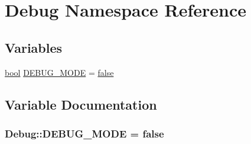 \hypertarget{namespace_debug}{\section{Debug Namespace Reference}
\label{namespace_debug}
}
\subsection*{Variables}
\begin{DoxyCompactItemize}
\item 
\hyperlink{term__entry_8h_a002004ba5d663f149f6c38064926abac}{bool} \hyperlink{namespace_debug_a621fd44120246c6ee55fa9f3870ba05a}{D\-E\-B\-U\-G\-\_\-\-M\-O\-D\-E} = \hyperlink{_snake_8cpp_ae6c865df784842196d411c1466b01686}{false}
\end{DoxyCompactItemize}


\subsection{Variable Documentation}
\hypertarget{namespace_debug_a621fd44120246c6ee55fa9f3870ba05a}{
\subsubsection[{D\-E\-B\-U\-G\-\_\-\-M\-O\-D\-E}]{ Debug\-::\-D\-E\-B\-U\-G\-\_\-\-M\-O\-D\-E = {\bf false}}}\label{namespace_debug_a621fd44120246c6ee55fa9f3870ba05a}
